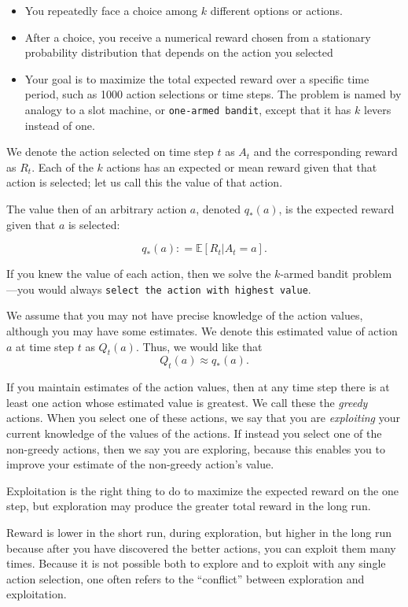 \documentclass[
  letterpaper,
]{krantz}
\providecommand{\tightlist}{%
  \setlength{\itemsep}{0pt}\setlength{\parskip}{0pt}}\usepackage{longtable,booktabs,array}
\theoremstyle{plain}
\theoremstyle{definition}
\theoremstyle{definition}
\theoremstyle{remark}
\begin{document}
\begin{itemize}
\tightlist
\item
  You repeatedly face a choice among \(k\) different options or actions.
\item
  After a choice, you receive a numerical reward chosen from a
  stationary probability distribution that depends on the action you
  selected
\item
  Your goal is to maximize the total expected reward over a specific
  time period, such as 1000 action selections or time steps. The problem
  is named by analogy to a slot machine, or \texttt{one-armed\ bandit},
  except that it has \(k\) levers instead of one.
\end{itemize}

We denote the action selected on time step \(t\) as \(A_t\) and the
corresponding reward as \(R_t\). Each of the \(k\) actions has an
expected or mean reward given that that action is selected; let us call
this the value of that action.

The value then of an arbitrary action \(a\), denoted \(q_{*} (a)\), is
the expected reward given that \(a\) is selected:

\[
    q_{*}(a): = \mathbb{E} \left[ R_t | A_t =a\right].
\]

If you knew the value of each action, then we solve the \(k\)-armed
bandit problem---you would always
\texttt{select\ the\ action\ with\ highest\ value}.

We assume that you may not have precise knowledge of the action values,
although you may have some estimates. We denote this estimated value of
action \(a\) at time step \(t\) as \(Q_t(a)\). Thus, we would like that
\[
    Q_t(a) \approx q_{*}(a).
\]

If you maintain estimates of the action values, then at any time step
there is at least one action whose estimated value is greatest. We call
these the \emph{greedy} actions. When you select one of these actions,
we say that you are \emph{exploiting} your current knowledge of the
values of the actions. If instead you select one of the non-greedy
actions, then we say you are exploring, because this enables you to
improve your estimate of the non-greedy action's value.

Exploitation is the right thing to do to maximize the expected reward on
the one step, but exploration may produce the greater total reward in
the long run.

Reward is lower in the short run, during exploration, but higher in the
long run because after you have discovered the better actions, you can
exploit them many times. Because it is not possible both to explore and
to exploit with any single action selection, one often refers to the
``conflict'' between exploration and exploitation.
\end{document}
